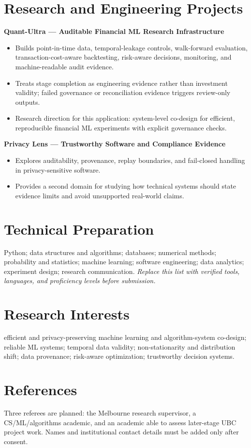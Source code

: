 \documentclass[11pt]{article}
\begin{document}
\section*{Research and Engineering Projects}
\textbf{Quant-Ultra --- Auditable Financial ML Research Infrastructure}
\begin{itemize}
\item Builds point-in-time data, temporal-leakage controls, walk-forward evaluation, transaction-cost-aware backtesting, risk-aware decisions, monitoring, and machine-readable audit evidence.
\item Treats stage completion as engineering evidence rather than investment validity; failed governance or reconciliation evidence triggers review-only outputs.
\item Research direction for this application: system-level co-design for efficient, reproducible financial ML experiments with explicit governance checks.
\end{itemize}

\begin{samepage}
\textbf{Privacy Lens --- Trustworthy Software and Compliance Evidence}
\begin{itemize}
\item Explores auditability, provenance, replay boundaries, and fail-closed handling in privacy-sensitive software.
\item Provides a second domain for studying how technical systems should state evidence limits and avoid unsupported real-world claims.
\end{itemize}
\end{samepage}

\section*{Technical Preparation}
Python; data structures and algorithms; databases; numerical methods; probability and statistics; machine learning; software engineering; data analytics; experiment design; research communication. \textit{Replace this list with verified tools, languages, and proficiency levels before submission.}

\section*{Research Interests}
efficient and privacy-preserving machine learning and algorithm-system co-design; reliable ML systems; temporal data validity; non-stationarity and distribution shift; data provenance; risk-aware optimization; trustworthy decision systems.

\section*{References}
Three referees are planned: the Melbourne research supervisor, a CS/ML/algorithms academic, and an academic able to assess later-stage UBC project work. Names and institutional contact details must be added only after consent.
\end{document}
